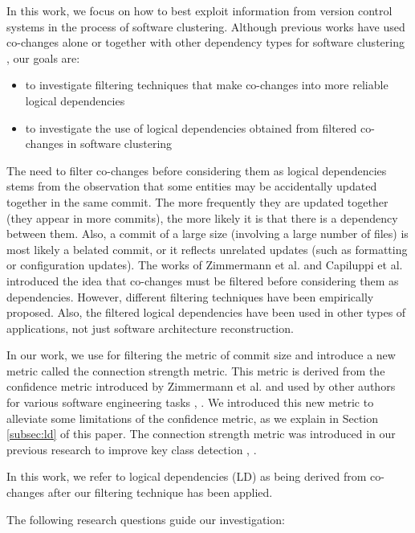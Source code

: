\documentclass{ieeeaccess}
\begin{document}
In this work, we focus on how to best exploit information from version control systems in the process of software clustering. Although previous works have used co-changes alone or together with other dependency types for software clustering \cite{b18, b16}, our goals are:
\begin{itemize}
  \item to investigate filtering techniques that make co-changes into more reliable logical dependencies
  \item to investigate the use of logical dependencies obtained from filtered co-changes in software clustering
\end{itemize}

The need to filter co-changes before considering them as logical dependencies stems from the observation that some entities may be accidentally updated together in the same commit. The more frequently they are updated together (they appear in more commits), the more likely it is that there is a dependency between them. Also, a commit of a large size (involving a large number of files) is most likely a belated commit, or it reflects unrelated updates (such as formatting or configuration updates).
The works of Zimmermann et al. \cite{Zimmermann:2004:MVH:998675.999460, b7} and  Capiluppi et al. \cite{b1, b12017} introduced the idea that co-changes must be filtered before considering them as dependencies. However, different filtering techniques have been empirically proposed. Also, the filtered logical dependencies have been used in other types of applications, not just software architecture reconstruction.

In our work, we use for filtering the metric of commit size and introduce a new metric called the connection strength metric. This metric is derived from the confidence metric introduced by Zimmermann et al. \cite{Zimmermann:2004:MVH:998675.999460} and used by other authors for various software engineering tasks \cite{article-Kagdi-commit}, \cite{Mandal-clones}. We introduced this new metric to alleviate some limitations of the confidence metric, as we explain in Section \ref{subsec:ld} of this paper. The connection strength metric was introduced in our previous research to improve key class detection \cite{b1}, \cite{b4}.

In this work, we refer to logical dependencies (LD) as being derived from co-changes after our filtering technique has been applied.

The following research questions guide our investigation:
\end{document}
